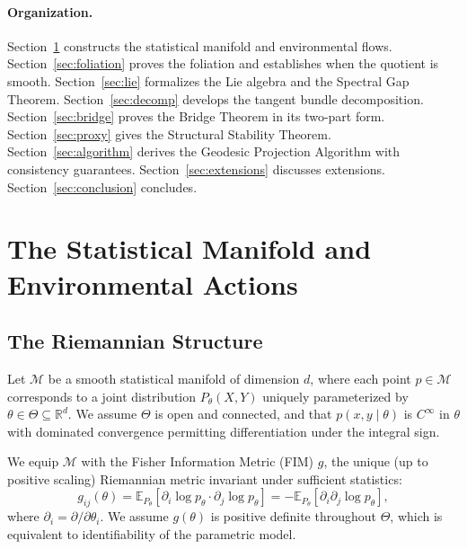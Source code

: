 \documentclass[11pt,a4paper]{article}
\newcommand{\cM}{\mathcal{M}}
\newcommand{\bR}{\mathbb{R}}
\newcommand{\EE}{\mathbb{E}}
\begin{document}
\paragraph{Organization.} Section~\ref{sec:manifold} constructs the statistical manifold and environmental flows. Section~\ref{sec:foliation} proves the foliation and establishes when the quotient is smooth. Section~\ref{sec:lie} formalizes the Lie algebra and the Spectral Gap Theorem. Section~\ref{sec:decomp} develops the tangent bundle decomposition. Section~\ref{sec:bridge} proves the Bridge Theorem in its two-part form. Section~\ref{sec:proxy} gives the Structural Stability Theorem. Section~\ref{sec:algorithm} derives the Geodesic Projection Algorithm with consistency guarantees. Section~\ref{sec:extensions} discusses extensions. Section~\ref{sec:conclusion} concludes.

\section{The Statistical Manifold and Environmental Actions}
\label{sec:manifold}

\subsection{The Riemannian Structure}

Let $\cM$ be a smooth statistical manifold of dimension $d$, where each point $p \in \cM$ corresponds to a joint distribution $P_\theta(X, Y)$ uniquely parameterized by $\theta \in \Theta \subseteq \bR^d$. We assume $\Theta$ is open and connected, and that $p(x, y \mid \theta)$ is $C^\infty$ in $\theta$ with dominated convergence permitting differentiation under the integral sign.

We equip $\cM$ with the Fisher Information Metric (FIM) $g$, the unique (up to positive scaling) Riemannian metric invariant under sufficient statistics:
\begin{equation}
g_{ij}(\theta) = \EE_{P_\theta}\!\left[\partial_i \log p_\theta \cdot \partial_j \log p_\theta\right]
= -\EE_{P_\theta}\!\left[\partial_i \partial_j \log p_\theta\right],
\label{eq:fim}
\end{equation}
where $\partial_i = \partial/\partial\theta_i$. We assume $g(\theta)$ is positive definite throughout $\Theta$, which is equivalent to identifiability of the parametric model.
\end{document}
